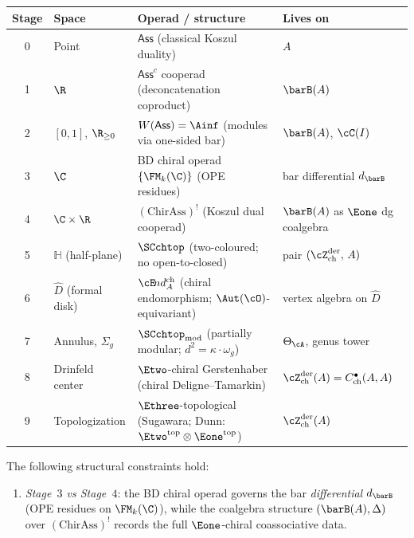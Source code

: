 \begin{proposition}
\smallskip
\begin{center}
\renewcommand{\arraystretch}{1.25}
\begin{tabular}{@{}clp{5.6cm}l@{}}
\toprule
\textbf{Stage} & \textbf{Space} & \textbf{Operad / structure}
 & \textbf{Lives on} \\
\midrule
0 & Point
 & $\mathsf{Ass}$ \textup{(}classical Koszul duality\textup{)}
 & $A$ \\
1 & $\R$
 & $\mathsf{Ass}^c$ cooperad \textup{(}deconcatenation coproduct\textup{)}
 & $\barB(A)$ \\
2 & $[0,1]$, $\R_{\ge 0}$
 & $W(\mathsf{Ass}) = \Ainf$ \textup{(}modules via one-sided bar\textup{)}
 & $\barB(A)$, $\cC(I)$ \\
3 & $\C$
 & BD chiral operad $\{\FM_k(\C)\}$ \textup{(}OPE residues\textup{)}
 & bar differential $d_{\barB}$ \\
4 & $\C \times \R$
 & $(\mathrm{ChirAss})^!$ \textup{(}Koszul dual cooperad\textup{)}
 & $\barB(A)$ as $\Eone$ dg coalgebra \\
5 & $\mathbb{H}$ \textup{(}half-plane\textup{)}
 & $\SCchtop$ \textup{(}two-coloured; no open-to-closed\textup{)}
 & pair $(\cZ^{\mathrm{der}}_{\mathrm{ch}},\, A)$ \\
6 & $\widehat{D}$ \textup{(}formal disk\textup{)}
 & $\cE\!nd^{\mathrm{ch}}_A$ \textup{(}chiral endomorphism;
 $\Aut(\cO)$-equivariant\textup{)}
 & vertex algebra on $\widehat{D}$ \\
7 & Annulus, $\Sigma_g$
 & $\SCchtop_{\mathrm{mod}}$ \textup{(}partially modular;
 $d^2 = \kappa \cdot \omega_g$\textup{)}
 & $\Theta_\cA$, genus tower \\
8 & Drinfeld center
 & $\Etwo$-chiral Gerstenhaber \textup{(}chiral
 Deligne--Tamarkin\textup{)}
 & $\cZ^{\mathrm{der}}_{\mathrm{ch}}(A) =
 C^\bullet_{\mathrm{ch}}(A,A)$ \\
9 & Topologization
 & $\Ethree$-topological \textup{(}Sugawara; Dunn:
 $\Etwo^{\mathrm{top}} \otimes \Eone^{\mathrm{top}}$\textup{)}
 & $\cZ^{\mathrm{der}}_{\mathrm{ch}}(A)$ \\
\bottomrule
\end{tabular}
\end{center}

\smallskip\noindent
The following structural constraints hold:
\begin{enumerate}[label=\textup{(\roman*)}]
\item \emph{Stage~$3$ vs Stage~$4$}: the BD chiral operad governs
 the bar \emph{differential} $d_{\barB}$
 \textup{(}OPE residues on $\FM_k(\C)$\textup{)}, while the
 coalgebra structure $(\barB(A), \Delta)$ over
 $(\mathrm{ChirAss})^!$ records the full $\Eone$-chiral
 coassociative data.


\end{enumerate}
\end{proposition}
